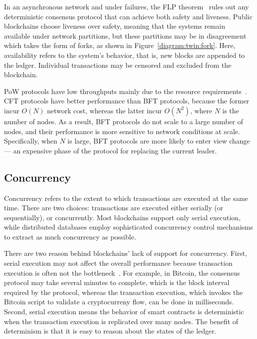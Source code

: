 In an asynchronous network and under failures, the FLP
theorem~\cite{fischer1982impossibility} rules out any deterministic consensus
protocol that can achieve both safety and liveness. Public blockchains choose
liveness over safety, meaning that the systems remain available under network
partitions, but these partitions may be in disagreement which takes the form of
forks, as shown in Figure~\ref{diagram:twin:fork}.
Here, availability refers to the system's behavior, that is, new
blocks are appended to the ledger. Individual transactions may be
censored and excluded from the blockchain.

PoW protocols have low throughputs mainly due to the resource
requirements~\cite{dinh2017blockbench}.
CFT protocols have better performance than BFT protocols, because the former
incur $O(N)$ network cost, whereas the latter incur $O(N^2)$, where $N$ is the
number of nodes. As a result, BFT protocols do not scale to a large number of
nodes, and their performance is more sensitive to network conditions at scale.
Specifically, when $N$ is large, BFT protocols are more likely to enter view
change --- an expensive phase of the protocol for replacing the current leader.


\subsection{Concurrency}

Concurrency refers to the extent to which transactions are executed at the same
time. There are two choices: transactions are executed either serially (or
sequentially), or concurrently. Most blockchains support only serial execution,
while distributed databases employ sophisticated concurrency control mechanisms
to extract as much concurrency as possible.

There are two reason behind blockchains' lack of support for concurrency. First,
serial execution may not affect the overall performance because transaction
execution is often not the bottleneck~\cite{dinh2017blockbench}.   For
example, in Bitcoin, the consensus protocol may take several minutes to
complete, which is the block interval required by the protocol, whereas the
transaction execution, which invokes the Bitcoin script to validate a
cryptocurreny flow, can be done in milliseconds. Second, serial execution means
the behavior of smart contracts is deterministic when the transaction execution
is replicated over many nodes. The benefit of determinism is that it is easy to
reason about the states of the ledger.

